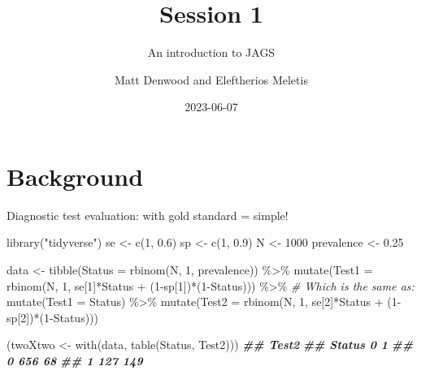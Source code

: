 \documentclass[
  ignorenonframetext,
  aspectratio=169,
]{beamer}
\title{Session 1}
\subtitle{An introduction to JAGS}
\author{Matt Denwood and Eleftherios Meletis}
\date{2023-06-07}
\newenvironment{Shaded}{\begin{snugshade}}{\end{snugshade}}
\newcommand{\AttributeTok}[1]{\textcolor[rgb]{0.77,0.63,0.00}{#1}}
\newcommand{\CommentTok}[1]{\textcolor[rgb]{0.56,0.35,0.01}{\textit{#1}}}
\newcommand{\DecValTok}[1]{\textcolor[rgb]{0.00,0.00,0.81}{#1}}
\newcommand{\DocumentationTok}[1]{\textcolor[rgb]{0.56,0.35,0.01}{\textbf{\textit{#1}}}}
\newcommand{\FloatTok}[1]{\textcolor[rgb]{0.00,0.00,0.81}{#1}}
\newcommand{\FunctionTok}[1]{\textcolor[rgb]{0.00,0.00,0.00}{#1}}
\newcommand{\NormalTok}[1]{#1}
\newcommand{\OtherTok}[1]{\textcolor[rgb]{0.56,0.35,0.01}{#1}}
\newcommand{\SpecialCharTok}[1]{\textcolor[rgb]{0.00,0.00,0.00}{#1}}
\newcommand{\StringTok}[1]{\textcolor[rgb]{0.31,0.60,0.02}{#1}}
\begin{document}
\frame{\titlepage}

\hypertarget{background}{%
\section{Background}\label{background}}

\begin{frame}[fragile]{Diagnostic test evaluation: with gold standard =
simple!}
\protect\hypertarget{diagnostic-test-evaluation-with-gold-standard-simple}{}
\scriptsize

\begin{Shaded}
\begin{Highlighting}[]
\FunctionTok{library}\NormalTok{(}\StringTok{"tidyverse"}\NormalTok{)}
\NormalTok{se }\OtherTok{\textless{}{-}} \FunctionTok{c}\NormalTok{(}\DecValTok{1}\NormalTok{, }\FloatTok{0.6}\NormalTok{)}
\NormalTok{sp }\OtherTok{\textless{}{-}} \FunctionTok{c}\NormalTok{(}\DecValTok{1}\NormalTok{, }\FloatTok{0.9}\NormalTok{)}
\NormalTok{N }\OtherTok{\textless{}{-}} \DecValTok{1000}
\NormalTok{prevalence }\OtherTok{\textless{}{-}} \FloatTok{0.25}

\NormalTok{data }\OtherTok{\textless{}{-}} \FunctionTok{tibble}\NormalTok{(}\AttributeTok{Status =} \FunctionTok{rbinom}\NormalTok{(N, }\DecValTok{1}\NormalTok{, prevalence)) }\SpecialCharTok{\%\textgreater{}\%}
  \FunctionTok{mutate}\NormalTok{(}\AttributeTok{Test1 =} \FunctionTok{rbinom}\NormalTok{(N, }\DecValTok{1}\NormalTok{, se[}\DecValTok{1}\NormalTok{]}\SpecialCharTok{*}\NormalTok{Status }\SpecialCharTok{+}\NormalTok{ (}\DecValTok{1}\SpecialCharTok{{-}}\NormalTok{sp[}\DecValTok{1}\NormalTok{])}\SpecialCharTok{*}\NormalTok{(}\DecValTok{1}\SpecialCharTok{{-}}\NormalTok{Status))) }\SpecialCharTok{\%\textgreater{}\%}
  \CommentTok{\# Which is the same as:}
  \FunctionTok{mutate}\NormalTok{(}\AttributeTok{Test1 =}\NormalTok{ Status) }\SpecialCharTok{\%\textgreater{}\%}
  \FunctionTok{mutate}\NormalTok{(}\AttributeTok{Test2 =} \FunctionTok{rbinom}\NormalTok{(N, }\DecValTok{1}\NormalTok{, se[}\DecValTok{2}\NormalTok{]}\SpecialCharTok{*}\NormalTok{Status }\SpecialCharTok{+}\NormalTok{ (}\DecValTok{1}\SpecialCharTok{{-}}\NormalTok{sp[}\DecValTok{2}\NormalTok{])}\SpecialCharTok{*}\NormalTok{(}\DecValTok{1}\SpecialCharTok{{-}}\NormalTok{Status)))}

\NormalTok{(twoXtwo }\OtherTok{\textless{}{-}} \FunctionTok{with}\NormalTok{(data, }\FunctionTok{table}\NormalTok{(Status, Test2)))}
\DocumentationTok{\#\#       Test2}
\DocumentationTok{\#\# Status   0   1}
\DocumentationTok{\#\#      0 656  68}
\DocumentationTok{\#\#      1 127 149}
\end{Highlighting}
\end{Shaded}


\end{frame}
\end{document}
